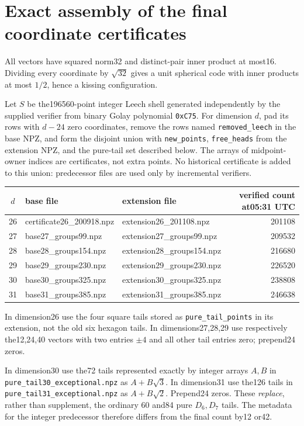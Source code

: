 \section*{Exact assembly of the final coordinate certificates}
All vectors have squared norm32 and distinct-pair inner product at most16.
Dividing every coordinate by $\sqrt{32}$ gives a unit spherical code with
inner products at most $1/2$, hence a kissing configuration.

Let $S$ be the196560-point integer Leech shell generated independently by
the supplied verifier from binary Golay polynomial \texttt{0xC75}.
For dimension $d$, pad its rows with $d-24$ zero coordinates, remove the
rows named \texttt{removed\_leech} in the base NPZ, and form the disjoint union
with \texttt{new\_points}, \texttt{free\_heads} from the extension NPZ, and
the pure-tail set described below. The arrays of midpoint-owner indices
are certificates, not extra points. No historical certificate is added
to this union: predecessor files are used only by incremental verifiers.

\begin{center}\begin{tabular}{c|l|l|r}
$d$&base file&extension file&verified count at05:31 UTC\\\hline
26&certificate26\_200918.npz&extension26\_201108.npz&201108\\
27&base27\_groups99.npz&extension27\_groups99.npz&209532\\
28&base28\_groups154.npz&extension28\_groups154.npz&216680\\
29&base29\_groups230.npz&extension29\_groups230.npz&226520\\
30&base30\_groups325.npz&extension30\_groups325.npz&238808\\
31&base31\_groups385.npz&extension31\_groups385.npz&246638
\end{tabular}\end{center}

In dimension26 use the four square tails stored as
\texttt{pure\_tail\_points} in its extension, not the old six hexagon tails.
In dimensions27,28,29 use respectively the12,24,40 vectors with two
entries $\pm4$ and all other tail entries zero; prepend24 zeros.

In dimension30 use the72 tails represented exactly by integer arrays
$A,B$ in \texttt{pure\_tail30\_exceptional.npz} as $A+B\sqrt3$.
In dimension31 use the126 tails in
\texttt{pure\_tail31\_exceptional.npz} as $A+B\sqrt2$.
Prepend24 zeros. These \emph{replace}, rather than supplement, the ordinary
60 and84 pure $D_6,D_7$ tails. The metadata for the integer predecessor
therefore differs from the final count by12 or42.

